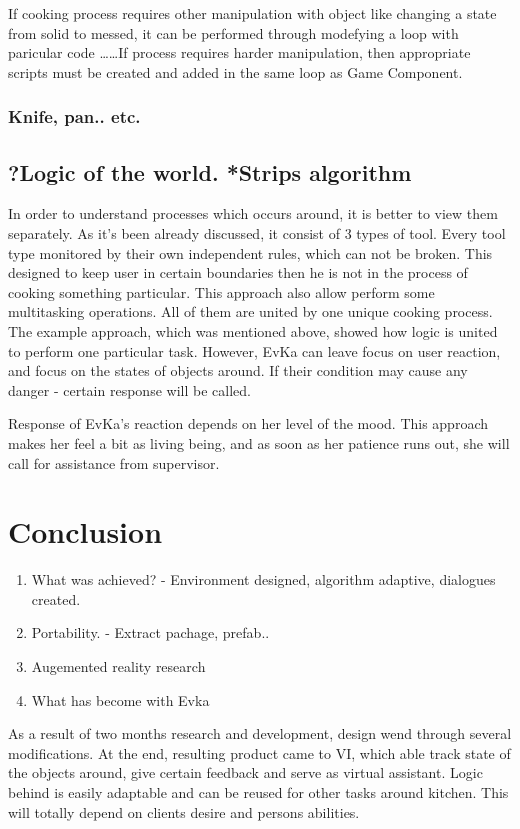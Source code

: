 \documentclass[18pt]{article}
\numberwithin{equation}{section} %
\numberwithin{figure}{section} %
\numberwithin{table}{section} %
\begin{document}
	If cooking process requires other manipulation with object like changing a state from solid to messed, it can be performed through modefying a loop with paricular code \ldots \ldots If process requires harder manipulation, then appropriate scripts must be created and added in the same loop as Game Component. 
	
	\subsubsection{Knife, pan.. etc.}
	
	\subsection{?Logic of the world. *Strips algorithm}
	In order to understand processes which occurs around, it is better to view them separately. As it's been already discussed, it consist of 3 types of tool. Every tool type monitored by their own independent rules, which can not be broken. This designed to keep user in certain boundaries then he is not in the process of cooking something particular. This approach also allow perform some multitasking operations. All of them are united by one unique cooking process. The example approach, which was mentioned above, showed how logic is united to perform one particular task. However, EvKa can leave focus on user reaction, and focus on the states of objects around. If their condition may cause any danger - certain response will be called.
	
	Response of EvKa's reaction depends on her level of the mood. This approach makes her feel a bit as living being, and as soon as her patience runs out, she will call for assistance from supervisor.
	
	
\section{Conclusion}
\begin{enumerate}
	\item What was achieved? - Environment designed, algorithm adaptive, dialogues created.
	\item Portability. - Extract pachage, prefab..
	\item Augemented reality research
	\item What has become with Evka
\end{enumerate}
	As a result of two months research and development, design wend through several modifications. At the end, resulting product came to VI, which able track state of the objects around, give certain feedback and serve as virtual assistant. Logic behind is easily adaptable and can be reused for other tasks around kitchen. This will totally depend on clients desire and persons abilities. \\
	
\end{document}
